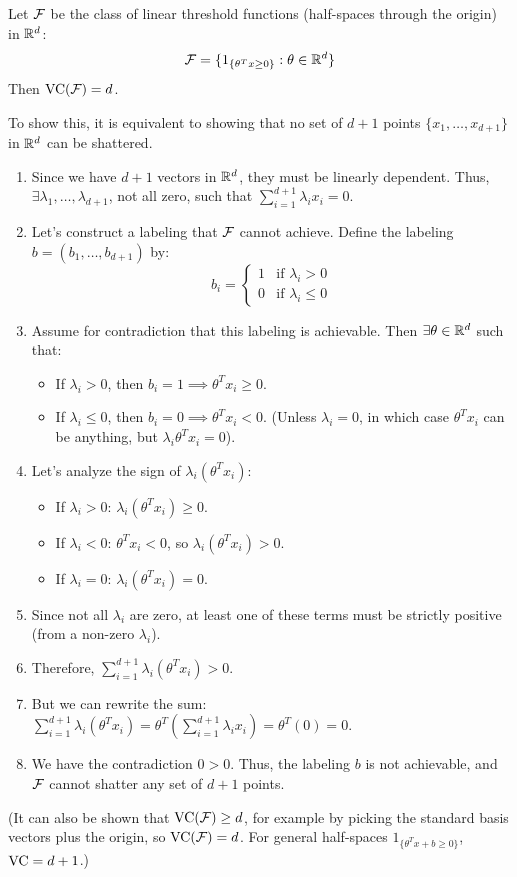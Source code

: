 \begin{eg}
    Let $\mathcal{F}$ be the class of linear threshold functions (half-spaces through the origin) in $\mathbb{R}^d$:
$$
\mathcal{F} = \{ 1_{\{\theta^T x \ge 0\}} : \theta \in \mathbb{R}^d \}
$$
Then $\text{VC}(\mathcal{F}) = d$.

To show this, it is equivalent to showing that no set of $d+1$ points $\{x_1, \dots, x_{d+1}\}$ in $\mathbb{R}^d$ can be shattered.
\begin{enumerate}
    \item Since we have $d+1$ vectors in $\mathbb{R}^d$, they must be linearly dependent.
    Thus, $\exists \lambda_1, \dots, \lambda_{d+1}$, not all zero, such that $\sum_{i=1}^{d+1} \lambda_i x_i = 0$.
    \item Let's construct a labeling that $\mathcal{F}$ cannot achieve. Define the labeling $b = (b_1, \dots, b_{d+1})$ by:
    $$
    b_i = \begin{cases} 1 & \text{if } \lambda_i > 0 \\ 0 & \text{if } \lambda_i \le 0 \end{cases}
    $$
    \item Assume for contradiction that this labeling is achievable. Then $\exists \theta \in \mathbb{R}^d$ such that:
    \begin{itemize}
        \item If $\lambda_i > 0$, then $b_i = 1 \implies \theta^T x_i \ge 0$.
        \item If $\lambda_i \le 0$, then $b_i = 0 \implies \theta^T x_i < 0$. (Unless $\lambda_i = 0$, in which case $\theta^T x_i$ can be anything, but $\lambda_i \theta^T x_i = 0$).
    \end{itemize}
    \item Let's analyze the sign of $\lambda_i (\theta^T x_i)$:
    \begin{itemize}
        \item If $\lambda_i > 0$: $\lambda_i (\theta^T x_i) \ge 0$.
        \item If $\lambda_i < 0$: $\theta^T x_i < 0$, so $\lambda_i (\theta^T x_i) > 0$.
        \item If $\lambda_i = 0$: $\lambda_i (\theta^T x_i) = 0$.
    \end{itemize}
    \item Since not all $\lambda_i$ are zero, at least one of these terms must be strictly positive (from a non-zero $\lambda_i$).
    \item Therefore, $\sum_{i=1}^{d+1} \lambda_i (\theta^T x_i) > 0$.
    \item But we can rewrite the sum: $\sum_{i=1}^{d+1} \lambda_i (\theta^T x_i) = \theta^T \left( \sum_{i=1}^{d+1} \lambda_i x_i \right) = \theta^T (0) = 0$.
    \item We have the contradiction $0 > 0$. Thus, the labeling $b$ is not achievable, and $\mathcal{F}$ cannot shatter any set of $d+1$ points.
\end{enumerate}
(It can also be shown that $\text{VC}(\mathcal{F}) \ge d$, for example by picking the standard basis vectors plus the origin, so $\text{VC}(\mathcal{F})=d$. For general half-spaces $1_{\{\theta^T x + b \ge 0\}}$, $\text{VC} = d+1$.)
\end{eg}


